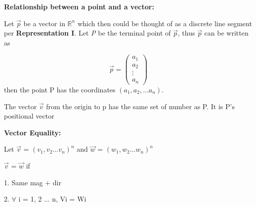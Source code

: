 \documentclass{article}
\begin{document}
\medskip

\textbf{Relationship between a point and a vector:}

Let $\vec{p}$ be a vector in $\mathbb{R} ^ n$ which then could be thought of as 
a discrete line segment per \textbf{Representation I}. Let \emph{P} be the terminal point of
$\vec{p}$, thus $\vec{p}$ can be written as 

\[
  \vec{p} = \begin{pmatrix}
      a_1 \\
      a_2 \\
      \vdots \\
      a_n
  \end{pmatrix}  
\]
then the point P has the coordinates $(a_1, a_2, ... a_n)$.

The vector $\vec{v}$ from the origin to p has the same set of number as P. 
It is P's positional vector

\medskip

\textbf{Vector Equality: }

Let $\vec{v}$ = $(v_1, v_2...v_n)^n$ and $\vec{w}$ = $(w_1, w_2...w_n)^n$

$\vec{v}$ = $\vec{w}$ if

1. Same mag + dir

2. $\forall$ i = 1, 2 ... n, Vi = Wi
\end{document}
